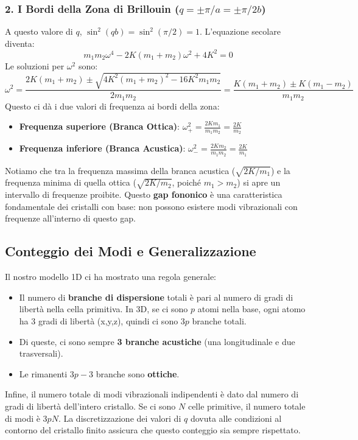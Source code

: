 \subsubsection{2. I Bordi della Zona di Brillouin (\(q = \pm \pi/a = \pm \pi/2b\))}
A questo valore di \(q\), \(\sin^2(qb) = \sin^2(\pi/2) = 1\). L'equazione secolare diventa:
\[ m_1m_2\omega^4 - 2K(m_1+m_2)\omega^2 + 4K^2 = 0 \]
Le soluzioni per \(\omega^2\) sono:
\[ \omega^2 = \frac{2K(m_1+m_2) \pm \sqrt{4K^2(m_1+m_2)^2 - 16K^2m_1m_2}}{2m_1m_2} = \frac{K(m_1+m_2) \pm K(m_1-m_2)}{m_1m_2} \]
Questo ci dà i due valori di frequenza ai bordi della zona:
\begin{itemize}
    \item \textbf{Frequenza superiore (Branca Ottica)}: \(\omega^2_+ = \frac{2Km_1}{m_1m_2} = \frac{2K}{m_2}\)
    \item \textbf{Frequenza inferiore (Branca Acustica)}: \(\omega^2_- = \frac{2Km_2}{m_1m_2} = \frac{2K}{m_1}\)
\end{itemize}
Notiamo che tra la frequenza massima della branca acustica (\(\sqrt{2K/m_1}\)) e la frequenza minima di quella ottica (\(\sqrt{2K/m_2}\), poiché \(m_1>m_2\)) si apre un intervallo di frequenze proibite. Questo \textbf{gap fononico} è una caratteristica fondamentale dei cristalli con base: non possono esistere modi vibrazionali con frequenze all'interno di questo gap.

\subsection{Conteggio dei Modi e Generalizzazione}
Il nostro modello 1D ci ha mostrato una regola generale:
\begin{itemize}
    \item Il numero di \textbf{branche di dispersione} totali è pari al numero di gradi di libertà nella cella primitiva. In 3D, se ci sono \(p\) atomi nella base, ogni atomo ha 3 gradi di libertà (x,y,z), quindi ci sono \(3p\) branche totali.
    \item Di queste, ci sono sempre \textbf{3 branche acustiche} (una longitudinale e due trasversali).
    \item Le rimanenti \textbf{\(3p-3\)} branche sono \textbf{ottiche}.
\end{itemize}
Infine, il numero totale di modi vibrazionali indipendenti è dato dal numero di gradi di libertà dell'intero cristallo. Se ci sono \(N\) celle primitive, il numero totale di modi è \(3pN\). La discretizzazione dei valori di \(q\) dovuta alle condizioni al contorno del cristallo finito assicura che questo conteggio sia sempre rispettato.